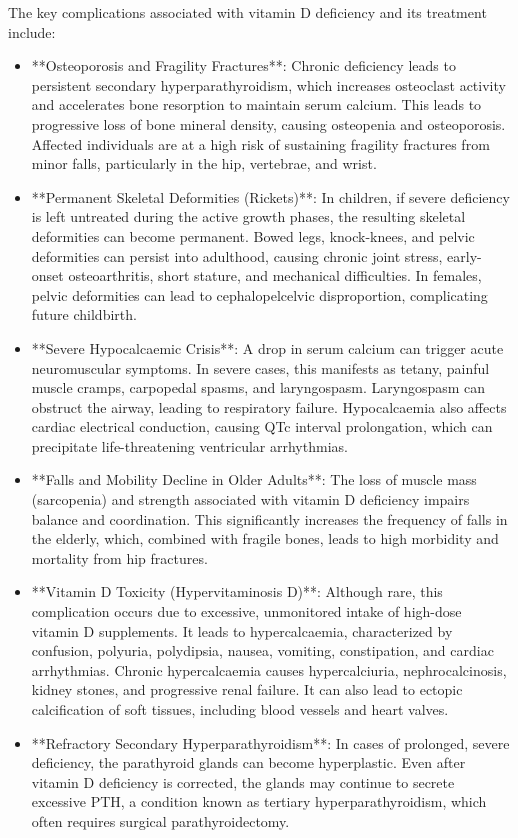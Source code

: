The key complications associated with vitamin D deficiency and its treatment include:
\begin{itemize}
    \item **Osteoporosis and Fragility Fractures**: Chronic deficiency leads to persistent secondary hyperparathyroidism, which increases osteoclast activity and accelerates bone resorption to maintain serum calcium. This leads to progressive loss of bone mineral density, causing osteopenia and osteoporosis. Affected individuals are at a high risk of sustaining fragility fractures from minor falls, particularly in the hip, vertebrae, and wrist.
    \item **Permanent Skeletal Deformities (Rickets)**: In children, if severe deficiency is left untreated during the active growth phases, the resulting skeletal deformities can become permanent. Bowed legs, knock-knees, and pelvic deformities can persist into adulthood, causing chronic joint stress, early-onset osteoarthritis, short stature, and mechanical difficulties. In females, pelvic deformities can lead to cephalopelcelvic disproportion, complicating future childbirth.
    \item **Severe Hypocalcaemic Crisis**: A drop in serum calcium can trigger acute neuromuscular symptoms. In severe cases, this manifests as tetany, painful muscle cramps, carpopedal spasms, and laryngospasm. Laryngospasm can obstruct the airway, leading to respiratory failure. Hypocalcaemia also affects cardiac electrical conduction, causing QTc interval prolongation, which can precipitate life-threatening ventricular arrhythmias.
    \item **Falls and Mobility Decline in Older Adults**: The loss of muscle mass (sarcopenia) and strength associated with vitamin D deficiency impairs balance and coordination. This significantly increases the frequency of falls in the elderly, which, combined with fragile bones, leads to high morbidity and mortality from hip fractures.
    \item **Vitamin D Toxicity (Hypervitaminosis D)**: Although rare, this complication occurs due to excessive, unmonitored intake of high-dose vitamin D supplements. It leads to hypercalcaemia, characterized by confusion, polyuria, polydipsia, nausea, vomiting, constipation, and cardiac arrhythmias. Chronic hypercalcaemia causes hypercalciuria, nephrocalcinosis, kidney stones, and progressive renal failure. It can also lead to ectopic calcification of soft tissues, including blood vessels and heart valves.
    \item **Refractory Secondary Hyperparathyroidism**: In cases of prolonged, severe deficiency, the parathyroid glands can become hyperplastic. Even after vitamin D deficiency is corrected, the glands may continue to secrete excessive PTH, a condition known as tertiary hyperparathyroidism, which often requires surgical parathyroidectomy.
\end{itemize}


